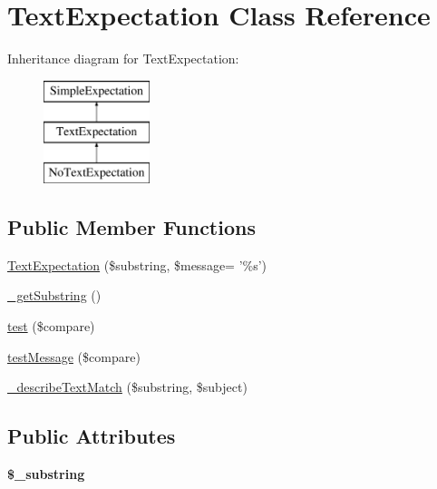 \hypertarget{class_text_expectation}{
\section{TextExpectation Class Reference}
\label{class_text_expectation}
}
Inheritance diagram for TextExpectation:\begin{figure}[H]
\begin{center}
\leavevmode
\includegraphics[height=3.000000cm]{class_text_expectation}
\end{center}
\end{figure}
\subsection*{Public Member Functions}
\begin{DoxyCompactItemize}
\item 
\hyperlink{class_text_expectation_a2305ea4ee24e0c0672af8605f25a524b}{TextExpectation} (\$substring, \$message= '\%s')
\item 
\hyperlink{class_text_expectation_a2569a76d2367fa368af6de6441930c53}{\_\-getSubstring} ()
\item 
\hyperlink{class_text_expectation_a352a2a95ccf1c29c886b7608338d3c20}{test} (\$compare)
\item 
\hyperlink{class_text_expectation_ab76e87201a16eb23fbb1fbafc24b51cf}{testMessage} (\$compare)
\item 
\hyperlink{class_text_expectation_aa2dce89d22209c3046dc9f5c994f0de3}{\_\-describeTextMatch} (\$substring, \$subject)
\end{DoxyCompactItemize}
\subsection*{Public Attributes}
\begin{DoxyCompactItemize}
\item 
\hypertarget{class_text_expectation_a7041132e555a195528300b856cd8906d}{
{\bfseries \$\_\-substring}}
\label{class_text_expectation_a7041132e555a195528300b856cd8906d}

\end{DoxyCompactItemize}



